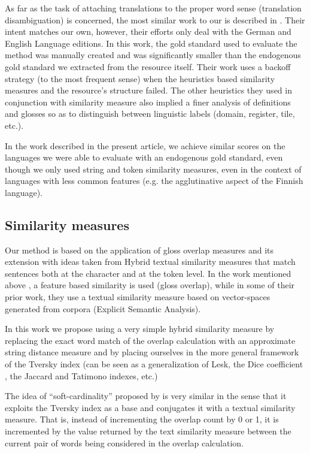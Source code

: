 \documentclass[10pt, a4paper]{article}
\begin{document}
As far as the task of attaching translations to the proper word sense (translation disambiguation) is concerned, the most similar work to our is described in \cite{meyer-gurevych:2012:PAPERS}. Their intent matches our own, however, their efforts  only deal with the German and English Language editions. In this work, the gold standard used to evaluate the method was manually created and was significantly smaller than the endogenous gold standard we extracted from the resource itself. Their work uses a backoff strategy (to the most frequent sense) when the heuristics based similarity measures and the resource's structure failed. The other heuristics they used in conjunction with similarity measure also implied a finer analysis of definitions and glosses so as to distinguish between linguistic labels (domain, register, tile, etc.).

In the work described in the present article, we achieve similar scores on the languages we were able to evaluate with an endogenous gold standard, even though we only used string and token similarity measures, even in the context of languages with less common features (e.g. the agglutinative aspect of the Finnish language).

\subsection{Similarity measures}
Our method is based on the application of gloss overlap measures and its extension with ideas taken from Hybrid textual similarity measures that match sentences both at the character and at the token level. In the work mentioned above \cite{meyer-gurevych:2012:PAPERS}, a feature based similarity is used (gloss overlap), while in some of their prior work, \cite{MeyerGurevych:2010}  they use a textual similarity measure based on vector-spaces generated from corpora (Explicit Semantic Analysis).

In this work we propose using a very simple hybrid similarity measure by replacing the exact word match of the overlap calculation with an approximate string distance measure and by placing ourselves in the more general framework of the Tversky index (can be seen as a generalization of Lesk, the Dice coefficient , the Jaccard and Tatimono indexes, etc.)

 The idea of ``soft-cardinality'' proposed by \cite{Jimenez2010,Jimenez2012} is very similar in the sense that it exploits the Tversky index as a base and conjugates it with a textual similarity measure. That is, instead of incrementing the overlap count by 0 or 1, it is incremented by the value returned by the text similarity measure between the current pair of words being considered in the overlap calculation.
 
\end{document}
